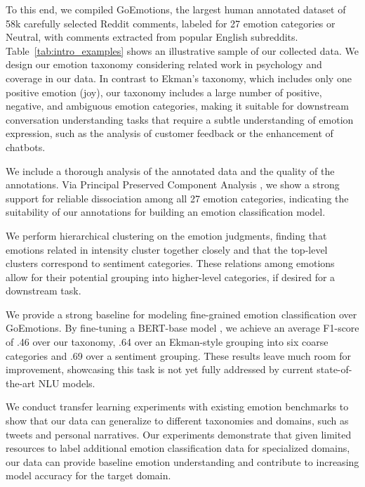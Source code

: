 \documentclass[11pt,a4paper]{article}
\begin{document}
To this end, we compiled GoEmotions, the largest human annotated dataset of 58k carefully selected Reddit comments, labeled for 27 emotion categories or Neutral, with comments extracted from popular English subreddits. Table~\ref{tab:intro_examples} shows an illustrative sample of our collected data. We design our emotion taxonomy considering related work in psychology and coverage in our data. In contrast to Ekman's taxonomy, which includes only one positive emotion (joy), our taxonomy includes a large number of positive, negative, and ambiguous emotion categories, making it suitable for downstream conversation understanding tasks that require a subtle understanding of emotion expression, such as the analysis of customer feedback or the enhancement of chatbots.

We include a thorough analysis of the annotated data and the quality of the annotations. Via Principal Preserved Component Analysis \citep{cowen2019primacy}, we show a strong support for reliable dissociation among all 27 emotion categories, indicating the suitability of our annotations for building an emotion classification model.

We perform hierarchical clustering  on the emotion judgments, finding that emotions related in intensity cluster together closely and that the top-level clusters correspond to sentiment categories. These relations among emotions allow for their potential grouping into higher-level categories, if desired for a downstream task.




We provide a strong baseline for modeling fine-grained emotion classification over GoEmotions. By fine-tuning a BERT-base model \citep{devlin2019bert}, we achieve an average F1-score of .46 over our taxonomy, .64 over an Ekman-style grouping into six coarse categories and .69 over a sentiment grouping. These results leave much room for improvement, showcasing this task is not yet fully addressed by current state-of-the-art NLU models.



We conduct transfer learning experiments with existing emotion benchmarks to show that our data can generalize to different taxonomies and domains, such as tweets and personal narratives. Our experiments demonstrate that given limited resources to label additional emotion classification data for specialized domains, our data can provide baseline emotion understanding and contribute to increasing model accuracy for the target domain.
\end{document}
